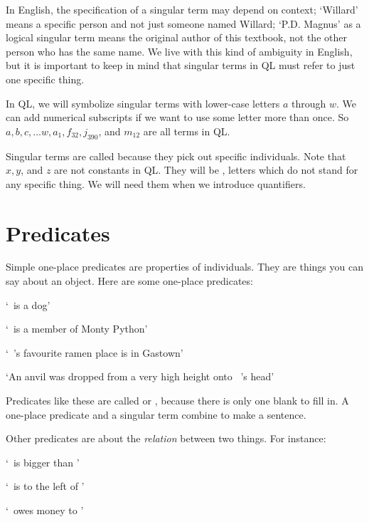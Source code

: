 In English, the specification of a singular term may depend on context; `Willard' means a specific person and not just someone named Willard; `P.D. Magnus' as a logical singular term means the original author of this textbook, not the other person who has the same name. We live with this kind of ambiguity in English, but it is important to keep in mind that singular terms in QL must refer to just one specific thing.

In QL, we will symbolize singular terms with lower-case letters $a$ through $w$. We can add numerical subscripts if we want to use some letter more than once. So $a,b,c,\ldots w, a_1, f_{32}, j_{390}$, and $m_{12}$ are all terms in QL.

Singular terms are called  because they pick out specific individuals. Note that $x, y$, and $z$ are not constants in QL. They will be , letters which do not stand for any specific thing. We will need them when we introduce quantifiers.

\section{Predicates}
Simple one-place predicates are properties of individuals. They are things you can say about an object. Here are some one-place predicates:

\begin{earg}
\item[] `\blank\ is a dog'
\item[] `\blank\ is a member of Monty Python'
\item[] `\blank\ 's favourite ramen place is in Gastown'
\item[] `An anvil was dropped from a very high height onto \blank\ 's head'
\end{earg}

Predicates like these are called  or , because there is only one blank to fill in. A one-place predicate and a singular term combine to make a sentence.

Other predicates are about the \emph{relation} between two things. For instance:

\begin{earg}
\item[] `\blank\ is bigger than \blank'
\item[] `\blank\ is to the left of \blank'
\item[] `\blank\ owes money to \blank'
\end{earg}

